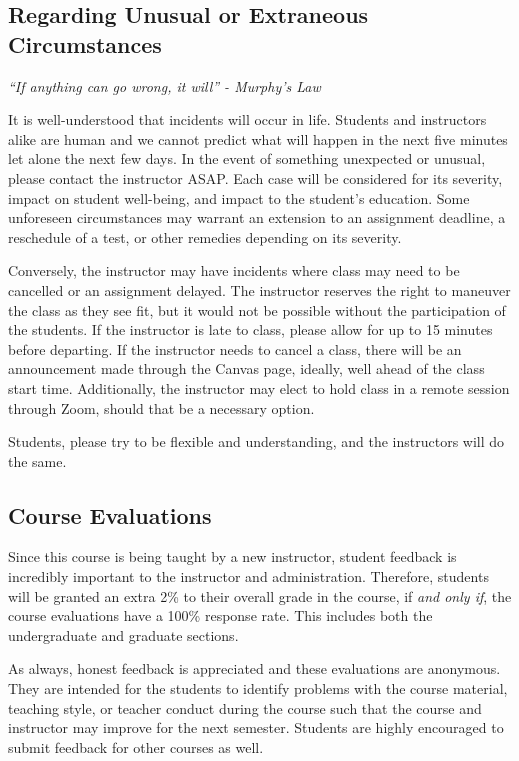 \documentclass[
	letterpaper, %
	fontsize=10pt, %
	twoside=true, %
	numbers=noenddot, %
]{kaobook}
\begin{document}
\subsection*{Regarding Unusual or Extraneous Circumstances} \label{ssec:unusual_circumstances}
\emph{``If anything can go wrong, it will'' - Murphy's Law}

It is well-understood that incidents will occur in life.
Students and instructors alike are human and we cannot predict what will happen in the next five minutes let alone the next few days.
In the event of something unexpected or unusual, please contact the instructor ASAP.
Each case will be considered for its severity, impact on student well-being, and impact to the student's education.
Some unforeseen circumstances may warrant an extension to an assignment deadline, a reschedule of a test, or other remedies depending on its severity.

Conversely, the instructor may have incidents where class may need to be cancelled or an assignment delayed. The instructor reserves the right to maneuver the class as they see fit, but it would not be possible without the participation of the students.
If the instructor is late to class, please allow for up to 15 minutes before departing.
If the instructor needs to cancel a class, there will be an announcement made through the Canvas page, ideally, well ahead of the class start time.
Additionally, the instructor may elect to hold class in a remote session through Zoom, should that be a necessary option.

Students, please try to be flexible and understanding, and the instructors will do the same.

\subsection*{Course Evaluations} \label{ssec:course_evals}
Since this course is being taught by a new instructor, student feedback is incredibly important to the instructor and administration.
Therefore, students will be granted an extra 2\% to their overall grade in the course, if \emph{and only if}, the course evaluations have a 100\% response rate.
This includes both the undergraduate and graduate sections.

As always, honest feedback is appreciated and these evaluations are anonymous.
They are intended for the students to identify problems with the course material, teaching style, or teacher conduct during the course such that the course and instructor may improve for the next semester.
Students are highly encouraged to submit feedback for other courses as well. 
\end{document}
